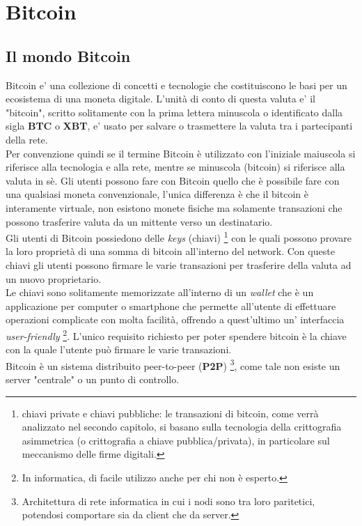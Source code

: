\chapter{Bitcoin}
\label{chap:fond}

\vspace*{1cm}

\section{Il mondo Bitcoin}
\label{sec:iniziare}
Bitcoin e' una collezione di concetti e tecnologie che costituiscono le basi per un ecosistema di una moneta digitale. L'unit\`a di conto di questa valuta e' il "bitcoin", scritto solitamente con la prima lettera minuscola o identificato dalla sigla \textbf{BTC } o \textbf{XBT}, e' usato per salvare o trasmettere la valuta tra i partecipanti della rete.\\
Per convenzione quindi se il termine Bitcoin \`e utilizzato con l'iniziale maiuscola si riferisce alla tecnologia e alla rete, mentre se minuscola (bitcoin) si riferisce alla valuta in s\`e.
Gli utenti possono fare con Bitcoin quello che \`e possibile fare con una qualsiasi moneta convenzionale, l'unica differenza \`e che il bitcoin \`e interamente virtuale, non esistono monete fisiche ma solamente transazioni che possono trasferire valuta da un mittente verso un destinatario.\\
Gli utenti di Bitcoin possiedono delle \textit{keys} (chiavi) \footnote{chiavi private e chiavi pubbliche: le transazioni di bitcoin, come verr\`a analizzato nel secondo capitolo, si
basano sulla tecnologia della crittografia asimmetrica (o crittografia a chiave pubblica/privata), in
particolare sul meccanismo delle firme digitali. } con le quali possono provare la loro propriet\`a di una somma di bitcoin all'interno del network. Con queste chiavi gli utenti possono firmare le varie transazioni per trasferire della valuta ad un nuovo proprietario.\\
Le chiavi sono solitamente memorizzate all'interno di un \textit{wallet} che \`e un applicazione per computer o smartphone che permette all'utente di effettuare operazioni complicate con molta facilit\`a, offrendo a quest'ultimo un' interfaccia \textit{user-friendly} \footnote{In informatica, di facile utilizzo anche per chi non \`e esperto.}. L'unico requisito richiesto per poter spendere bitcoin \`e la chiave con la quale l'utente pu\`o firmare le varie transazioni.\\
Bitcoin \`e un sistema distribuito peer-to-peer (\textbf{P2P}) \footnote{Architettura di rete informatica in cui i nodi sono tra loro paritetici, potendosi comportare sia da client che da server.}, come tale non esiste un server "centrale" o un punto di controllo.\\

